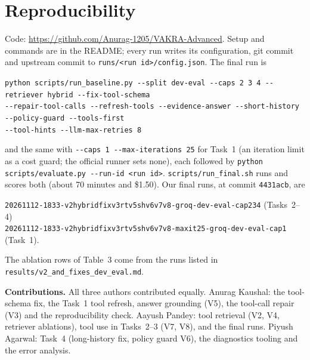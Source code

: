 \documentclass[10pt]{article}
\begin{document}
\section{Reproducibility}
Code: \url{https://github.com/Anurag-1205/VAKRA-Advanced}. Setup and commands are in the README; every run writes its
configuration, git commit and upstream commit to \texttt{runs/<run id>/config.json}. The final
run is
\begin{center}\small
\texttt{python scripts/run\_baseline.py -{}-split dev-eval -{}-caps 2 3 4 -{}-retriever hybrid
-{}-fix-tool-schema}\\
\texttt{-{}-repair-tool-calls -{}-refresh-tools -{}-evidence-answer -{}-short-history -{}-policy-guard
-{}-tools-first}\\
\texttt{-{}-tool-hints -{}-llm-max-retries 8}
\end{center}
and the same with \texttt{-{}-caps 1 -{}-max-iterations 25} for Task~1 (an iteration limit as a cost
guard; the official runner sets none), each followed by \texttt{python scripts/evaluate.py -{}-run-id <run id>}.
\texttt{scripts/run\_final.sh} runs and scores both (about 70 minutes and \$1.50). Our final runs, at commit
\texttt{4431acb}, are
\begin{center}\small
\texttt{20261112-1833-v2hybridfixv3rtv5shv6v7v8-groq-dev-eval-cap234} (Tasks~2--4)\\
\texttt{20261112-1833-v2hybridfixv3rtv5shv6v7v8-maxit25-groq-dev-eval-cap1} (Task~1).
\end{center}
The
ablation rows of Table~3 come from the runs listed in \texttt{results/v2\_and\_fixes\_dev\_eval.md}.

\textbf{Contributions.} All three authors contributed equally. Anurag Kaushal: the tool-schema fix,
the Task~1 tool refresh, answer grounding (V5), the tool-call repair (V3) and the reproducibility
check. Aayush Pandey: tool retrieval (V2, V4, retriever ablations), tool use in Tasks~2--3 (V7,
V8), and the final runs. Piyush Agarwal: Task~4 (long-history fix, policy
guard V6), the diagnostics tooling and the error analysis.
\end{document}
